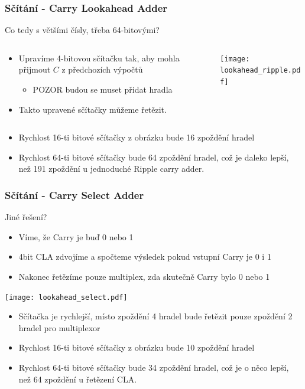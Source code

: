 \documentclass{beamer}
\begin{document}
\begin{frame}
\frametitle{Sčítání - Carry Lookahead Adder}

Co tedy s většími čísly, třeba 64-bitovými?

\begin{columns}
\begin{column}{0.45\textwidth}
\begin{itemize}
\item Upravíme 4-bitovou sčítačku tak, aby mohla přijmout $C$ z předchozích výpočtů
\begin{itemize}
\item POZOR budou se muset přidat hradla
\end{itemize}
\item Takto upravené sčítačky můžeme řetězit.
\end{itemize}
\end{column}
\begin{column}{0.55\textwidth}
\begin{center}
   \texttt{[image: lookahead\_ripple.pdf]}
\end{center}
\end{column}
\end{columns}


\begin{itemize}
\item Rychlost 16-ti bitové sčítačky z obrázku bude 16 zpoždění hradel
\item Rychlost 64-ti bitové sčítačky bude 64 zpoždění hradel, což je daleko lepší, než 191 zpoždění u jednoduché Ripple carry adder.
\end{itemize}

\end{frame}


\begin{frame}
\frametitle{Sčítání - Carry Select Adder}


Jiné řešení?

\begin{itemize}
\item Víme, že Carry je buď 0 nebo 1
\item 4bit CLA zdvojíme a spočteme výsledek pokud vstupní Carry je 0 i 1
\item Nakonec řetězíme pouze multiplex, zda skutečně Carry bylo 0 nebo 1
\end{itemize}
\begin{center}
   \texttt{[image: lookahead\_select.pdf]}
\end{center}

\begin{itemize}
\item Sčítačka je rychlejší, místo zpoždění 4 hradel bude řetězit pouze zpoždění 2 hradel pro multiplexor
\item Rychlost 16-ti bitové sčítačky z obrázku bude 10 zpoždění hradel
\item Rychlost 64-ti bitové sčítačky bude 34 zpoždění hradel, což je o něco lepší, než 64 zpoždění u řetězení CLA.
\end{itemize}

\end{frame}
\end{document}
